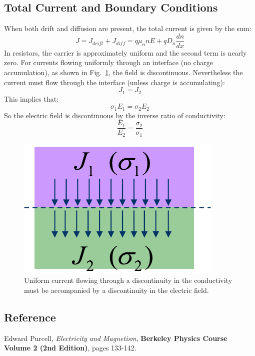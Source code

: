 \subsection{Total Current and Boundary Conditions}
When both drift and diffusion are present, the total current is given by the sum:
    \begin{equation}
        J = {J_{drift}} + {J_{diff}} = q{\mu _n}nE + q{D_n}\frac{{dn}}{{dx}}
    \end{equation}
In resistors, the carrier is approximately uniform and the second term is nearly zero. For currents flowing uniformly through an interface (no charge accumulation), as shown in Fig.~\ref{fig:slide50}, the field is discontinuous.  Nevertheless the current must flow through the interface (unless charge is accumulating):
    \begin{equation}
        {J_1} = {J_2}
    \end{equation}
This implies that:
    \begin{equation}
        {\sigma _1}{E_1} = {\sigma _2}{E_2}
    \end{equation}
So the electric field is discontinuous by the inverse ratio of conductivity:
    \begin{equation}
        \frac{{{E_1}}}{{{E_2}}} = \frac{{{\sigma _2}}}{{{\sigma _1}}}
    \end{equation}
\begin{figure}[tb]
\centering
\includegraphics[width=.25\columnwidth]{slide50}
\caption{Uniform current flowing through a discontinuity in the conductivity must be accompanied by a discontinuity in the electric field.}
\label{fig:slide50}
\end{figure}
\subsection{Reference}
Edward Purcell, \textit{Electricity and Magnetism}, \textbf{Berkeley Physics Course Volume 2 (2nd Edition)}, pages 133-142.
